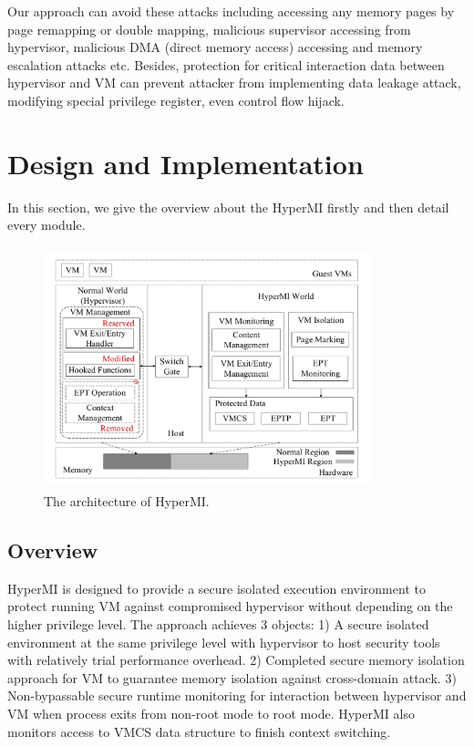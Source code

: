 \documentclass[conference]{IEEEtran}
\begin{document}
Our approach can avoid these attacks including accessing any memory pages by page remapping or double mapping, malicious supervisor accessing from hypervisor, malicious DMA (direct memory access) accessing and memory escalation attacks etc. Besides, protection for critical interaction data between hypervisor and VM can prevent attacker from implementing data leakage attack, modifying special privilege register, even control flow hijack.


\section{Design and Implementation}
In this section, we give the overview about the HyperMI firstly and then detail every module.

\begin{figure}
\centerline{\includegraphics[width=9.5cm, height=7cm]{pdfvmcs1.pdf}}%
\caption{The architecture of HyperMI. } \label{fig1}
\end{figure}

\subsection{Overview} 
HyperMI is designed to provide a secure isolated execution environment to protect running VM against compromised hypervisor without depending on the higher privilege level.
The approach achieves 3 objects: 1) A secure isolated environment at the same privilege level with hypervisor to host security tools with relatively trial performance overhead. 2) Completed secure memory isolation approach for VM to guarantee memory isolation against cross-domain attack. 3) Non-bypassable secure runtime monitoring for interaction between hypervisor and VM when process exits from non-root mode to root mode. HyperMI also monitors access to VMCS data structure to finish context switching.
\end{document}
